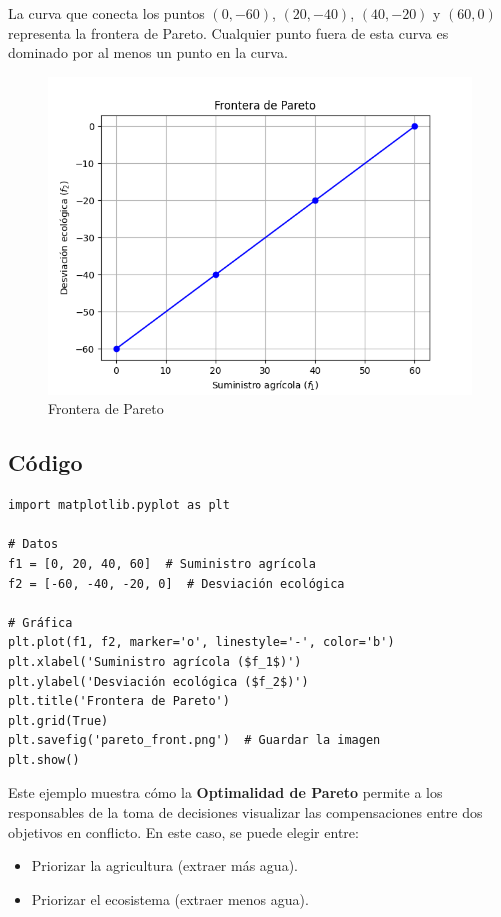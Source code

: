\documentclass[12pt]{article}
\begin{document}
La curva que conecta los puntos \((0, -60)\), \((20, -40)\), \((40, -20)\) y \((60, 0)\) representa la frontera de Pareto. Cualquier punto fuera de esta curva es dominado por al menos un punto en la curva.

\begin{figure}[h]
    \centering
    \includegraphics[width=0.9\linewidth]{Figure_pareto.png}
    \caption{Frontera de Pareto}
    \label{Pareto}
\end{figure}

\clearpage  %

\subsection*{Código}
\begin{lstlisting}[style=python]
import matplotlib.pyplot as plt

# Datos
f1 = [0, 20, 40, 60]  # Suministro agrícola
f2 = [-60, -40, -20, 0]  # Desviación ecológica

# Gráfica
plt.plot(f1, f2, marker='o', linestyle='-', color='b')
plt.xlabel('Suministro agrícola ($f_1$)')
plt.ylabel('Desviación ecológica ($f_2$)')
plt.title('Frontera de Pareto')
plt.grid(True)
plt.savefig('pareto_front.png')  # Guardar la imagen
plt.show()
\end{lstlisting}

Este ejemplo muestra cómo la \textbf{Optimalidad de Pareto} permite a los responsables de la toma de decisiones visualizar las compensaciones entre dos objetivos en conflicto. En este caso, se puede elegir entre:
\begin{itemize}
    \item Priorizar la agricultura (extraer más agua).
    \item Priorizar el ecosistema (extraer menos agua).
\end{itemize}
\end{document}
